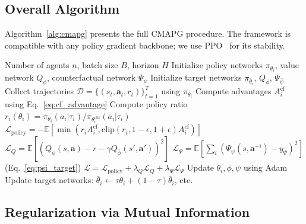 \documentclass[journal]{IEEEtran}
\begin{document}
\subsection{Overall Algorithm}

Algorithm~\ref{alg:cmapg} presents the full CMAPG procedure. The framework is compatible with any policy gradient backbone; we use PPO~\cite{schulman2017proximal} for its stability.

\begin{algorithm}[t]
\caption{CMAPG (with PPO backbone)}
\label{alg:cmapg}
\begin{algorithmic}[1]
\REQUIRE Number of agents $n$, batch size $B$, horizon $H$
\STATE Initialize policy networks $\pi_{\theta_i}$, value network $Q_\phi$, counterfactual network $\Psi_\psi$
\STATE Initialize target networks $\pi_{\bar{\theta}_i}$, $Q_{\bar{\phi}}$, $\Psi_{\bar{\psi}}$
    \STATE Collect trajectories $\mathcal{D} = \{(s_t, \mathbf{a}_t, r_t)\}_{t=1}^{T}$ using $\pi_{\theta_i}$
    \STATE Compute advantages $A_i^{\text{cf}}$ using Eq.~\eqref{eq:cf_advantage}
    \STATE Compute policy ratio $r_i(\theta_i) = \pi_{\theta_i}(a_i|\tau_i) / \pi_{\theta_i^{\text{old}}}(a_i|\tau_i)$
    \STATE $\mathcal{L}_{\text{policy}} = -\mathbb{E}\left[\min\left(r_i A_i^{\text{cf}}, \text{clip}(r_i, 1-\epsilon, 1+\epsilon) A_i^{\text{cf}}\right)\right]$
    \STATE $\mathcal{L}_{Q} = \mathbb{E}\left[(Q_\phi(s, \mathbf{a}) - r - \gamma Q_{\bar{\phi}}(s', \mathbf{a}'))^2\right]$
    \STATE $\mathcal{L}_{\Psi} = \mathbb{E}\left[\sum_i \left(\Psi_\psi(s, \mathbf{a}^{-i}) - y_\Psi\right)^2\right]$ \quad (Eq.~\ref{eq:psi_target})
    \STATE $\mathcal{L} = \mathcal{L}_{\text{policy}} + \lambda_Q \mathcal{L}_Q + \lambda_\Psi \mathcal{L}_\Psi$
    \STATE Update $\theta_i, \phi, \psi$ using Adam~\cite{kingma2015adam}
    \STATE Update target networks: $\bar{\theta}_i \leftarrow \tau \theta_i + (1-\tau) \bar{\theta}_i$, etc.
\ENDWHILE
\end{algorithmic}
\end{algorithm}

\subsection{Regularization via Mutual Information}
\end{document}
